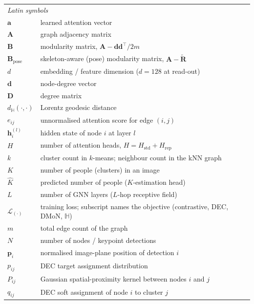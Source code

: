 {\begin{longtable}{p{3cm}l}
    \multicolumn{2}{l}{\textit{Latin symbols}} \\[3pt]
    $\mathbf{a}$             & learned attention vector \\
    $\mathbf{A}$             & graph adjacency matrix \\
    $\mathbf{B}$             & modularity matrix, $\mathbf{A}-\mathbf{d}\mathbf{d}^{\top}/2m$ \\
    $\mathbf{B}_{\mathrm{pose}}$ & skeleton-aware (pose) modularity matrix, $\mathbf{A}-\tilde{\mathbf{R}}$ \\
    $d$                      & embedding / feature dimension ($d=128$ at read-out) \\
    $\mathbf{d}$             & node-degree vector \\
    $\mathbf{D}$             & degree matrix \\
    $d_{\mathbb{H}}(\cdot,\cdot)$ & Lorentz geodesic distance \\
    $e_{ij}$                 & unnormalised attention score for edge $(i,j)$ \\
    $\mathbf{h}_i^{(l)}$     & hidden state of node $i$ at layer $l$ \\
    $H$                      & number of attention heads, $H=H_{\mathrm{std}}+H_{\mathrm{rep}}$ \\
    $k$                      & cluster count in $k$-means; neighbour count in the kNN graph \\
    $K$                      & number of people (clusters) in an image \\
    $\hat{K}$                & predicted number of people ($K$-estimation head) \\
    $L$                      & number of GNN layers ($L$-hop receptive field) \\
    $\mathcal{L}_{(\cdot)}$  & training loss; subscript names the objective (contrastive, DEC, DMoN, $\mathbb{H}$) \\
    $m$                      & total edge count of the graph \\
    $N$                      & number of nodes / keypoint detections \\
    $\mathbf{p}_i$           & normalised image-plane position of detection $i$ \\
    $p_{ij}$                 & DEC target assignment distribution \\
    $P_{ij}$                 & Gaussian spatial-proximity kernel between nodes $i$ and $j$ \\
    $q_{ij}$                 & DEC soft assignment of node $i$ to cluster $j$ \\

\end{longtable}}
